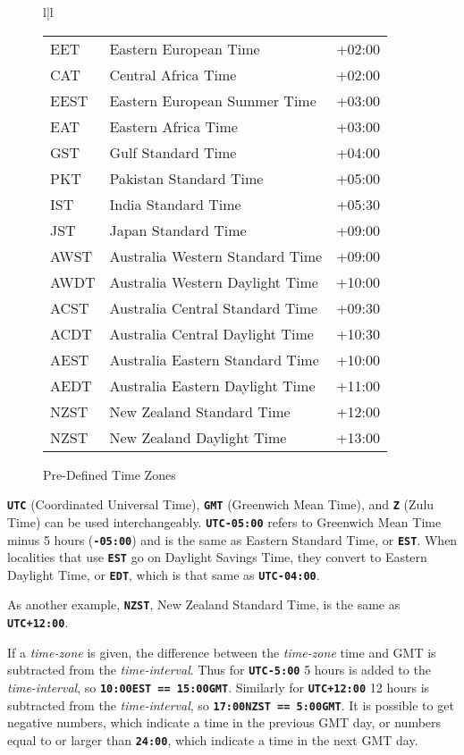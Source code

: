 \documentclass[12pt]{article}
\newcommand{\TT}[1]{{\tt \bfseries #1}}
\newcommand{\ttkey}[1]{{\tt \bfseries #1}}
\newlength{\figurewidth}
\newenvironment{boxedfigure}[1][!btp]%
	{\begin{figure*}[#1]
	 \begin{lrbox}{\figurebox}
	 \begin{minipage}{\figurewidth}

	 \vspace*{1ex}}%
	{
	 \vspace*{1ex}

	 \end{minipage}
	 \end{lrbox}
	 \begin{center}
	 \fbox{\hspace*{0.1in}\usebox{\figurebox}\hspace*{0.1in}}
	 \end{center}
	 \end{figure*}}
\begin{document}
\begin{boxedfigure}[t]
\begin{center}
\begin{tabular}{l|l}
\begin{tabular}[t]{@{}lll@{}}
EET   & Eastern European Time         & +02:00 \\
CAT   & Central Africa Time           & +02:00 \\
EEST  & Eastern European Summer Time  & +03:00 \\
EAT   & Eastern Africa Time           & +03:00 \\
GST   & Gulf Standard Time            & +04:00 \\
PKT   & Pakistan Standard Time        & +05:00 \\
IST   & India Standard Time           & +05:30 \\
JST   & Japan Standard Time           & +09:00 \\
AWST  & Australia Western Standard Time        & +09:00 \\
AWDT  & Australia Western Daylight Time        & +10:00 \\
ACST  & Australia Central Standard Time        & +09:30 \\
ACDT  & Australia Central Daylight Time        & +10:30 \\
AEST  & Australia Eastern Standard Time        & +10:00 \\
AEDT  & Australia Eastern Daylight Time        & +11:00 \\
NZST  & New Zealand Standard Time     & +12:00 \\
NZST  & New Zealand Daylight Time     & +13:00 \\
\end{tabular}
\end{tabular}
\end{center}
\vspace*{-3ex}
\caption{Pre-Defined Time Zones}
\label{PRE-DEFINED-TIME-ZONES}
\end{boxedfigure}

\ttkey{UTC} (Coordinated Universal Time), \ttkey{GMT}
(Greenwich Mean Time), and \ttkey{Z} (Zulu Time) can be used interchangeably.
\TT{UTC-05:00} refers to Greenwich Mean Time
minus 5 hours (\TT{-05:00}) and is the same as
Eastern Standard Time, or \TT{EST}.   When localities that use \TT{EST}
go on Daylight Savings Time, they convert to Eastern Daylight Time, or
\TT{EDT}, which is that same as \TT{UTC-04:00}.

As another example, \TT{NZST}, New Zealand Standard Time, is the same
as \TT{UTC+12:00}.

If a {\em time-zone} is given, the difference between the {\em time-zone}
time and GMT is subtracted from the {\em time-interval}.
Thus for \TT{UTC-5:00} 5 hours is added to the {\em time-interval},
so \TT{10:00EST == 15:00GMT}.
Similarly
for \TT{UTC+12:00} 12 hours is subtracted from the {\em time-interval},
so \TT{17:00NZST == 5:00GMT}.
It is possible to get negative numbers, which indicate a time in the previous
GMT day, or numbers equal to or larger than \TT{24:00}, which indicate
a time in the next GMT day.
\end{document}
